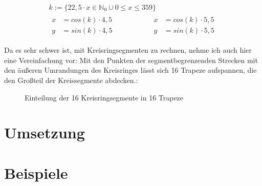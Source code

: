 \begin{gather}
k := \{22,5 \cdot x \in \mathbb{N}_0 \cup 0 \le x \le 359\} \\
\begin{split}
x &= cos(k) \cdot 4,5 \\
y &= sin(k) \cdot 4,5
\end{split}
\hspace{5em}
\begin{split}
x &= cos(k) \cdot 5,5 \\
y &= sin(k) \cdot 5,5
\end{split}
\end{gather}

Da es sehr schwer ist, mit Kreisringsegmenten zu rechnen, nehme ich auch hier eine Vereinfachung vor: Mit den Punkten der segmentbegrenzenden Strecken mit den äußeren Umrandungen des Kreisringes lässt sich 16 Trapeze aufspannen, die den Großteil der Kreissegmente abdecken.:
\begin{figure}[!ht]
	\centering	
	
	\caption{Einteilung der 16 Kreisringsegmente in 16 Trapeze}
\end{figure}
\section{Umsetzung}
\section{Beispiele}